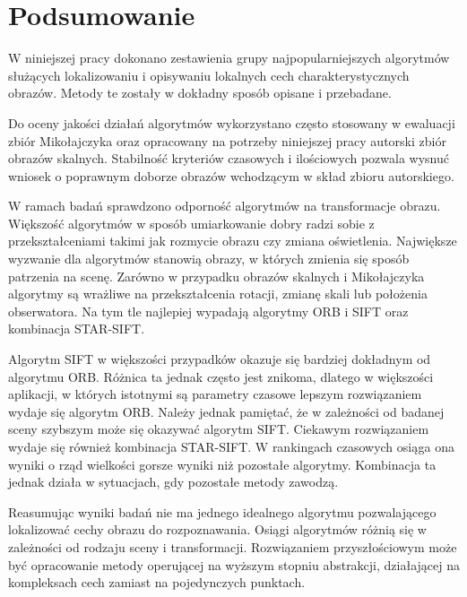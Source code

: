 \chapter{Podsumowanie}
W niniejszej pracy dokonano zestawienia grupy najpopularniejszych algorytmów służących lokalizowaniu i opisywaniu lokalnych cech charakterystycznych obrazów. Metody te zostały w dokładny sposób opisane i przebadane.

Do oceny jakości działań algorytmów wykorzystano często stosowany w ewaluacji zbiór Mikołajczyka oraz opracowany na potrzeby niniejszej pracy autorski zbiór obrazów skalnych. Stabilność kryteriów czasowych i ilościowych pozwala wysnuć wniosek o poprawnym doborze obrazów wchodzącym w skład zbioru autorskiego.

W ramach badań sprawdzono odporność algorytmów na transformacje obrazu. Większość algorytmów w sposób umiarkowanie dobry radzi sobie z przekształceniami takimi jak rozmycie obrazu czy zmiana oświetlenia. Największe wyzwanie dla algorytmów stanowią obrazy, w których zmienia się sposób patrzenia na scenę. Zarówno w przypadku obrazów skalnych i Mikołajczyka algorytmy są wrażliwe na przekształcenia rotacji, zmianę skali lub położenia obserwatora. Na tym tle najlepiej wypadają algorytmy ORB i SIFT oraz kombinacja STAR-SIFT.

Algorytm SIFT w większości przypadków okazuje się bardziej dokładnym od algorytmu ORB. Różnica ta jednak często jest znikoma, dlatego w większości aplikacji, w których istotnymi są parametry czasowe lepszym rozwiązaniem wydaje się algorytm ORB. Należy jednak pamiętać, że w zależności od badanej sceny szybszym może się okazywać algorytm SIFT. Ciekawym rozwiązaniem wydaje się również kombinacja STAR-SIFT. W rankingach czasowych osiąga ona wyniki o rząd wielkości gorsze wyniki niż pozostałe algorytmy. Kombinacja ta jednak działa w sytuacjach, gdy pozostałe metody zawodzą.

Reasumując wyniki badań nie ma jednego idealnego algorytmu pozwalającego lokalizować cechy obrazu do rozpoznawania. Osiągi algorytmów różnią się w zależności od rodzaju sceny i transformacji. Rozwiązaniem przyszłościowym może być opracowanie metody operującej na wyższym stopniu abstrakcji, działającej na kompleksach cech zamiast na pojedynczych punktach.